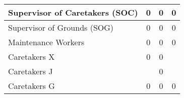 \begin{tabular}{l|c|c|c|}
        \multicolumn{1}{|l|}{\cellcolor{ccfuschialight}Supervisor of Caretakers (SOC)} & 0                                                      & 0                                                                & 0                                                      \\ \hline
        \multicolumn{1}{|l|}{\cellcolor{ccfuschialight}Supervisor of Grounds (SOG)}    & 0                                                      & 0                                                                & 0                                                      \\ \hline
        \multicolumn{1}{|l|}{\cellcolor{ccfuschialight}Maintenance Workers}            & 0                                                      & 0                                                                & 0                                                       \\ \hline
        \multicolumn{1}{|l|}{\cellcolor{ccfuschialight}Caretakers X}                   & 0                                                      & 0                                                                &                                                       \\ \cline{1-3}
        \multicolumn{1}{|l|}{\cellcolor{ccfuschialight}Caretakers J\tnote{1}}                   &                                                       & 0                                                                &                                                         \\ \cline{1-1} \cline{3-3}
        \multicolumn{1}{|l|}{\cellcolor{ccfuschialight}Caretakers G}                   & \multirow{-2}{*}{0}                                                      & 0                                     & \multirow{-3}{*}{0}                           \\ \hline
        \end{tabular}
        
        